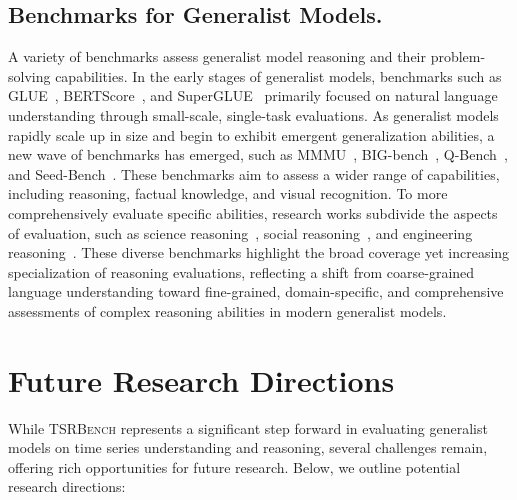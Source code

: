 \documentclass{article}
\theoremstyle{plain}
\theoremstyle{definition}
\theoremstyle{remark}
\theoremstyle{plain}
\begin{document}
\subsection{Benchmarks for Generalist Models.}
A variety of benchmarks assess generalist model reasoning and their problem-solving capabilities. In the early stages of generalist models, benchmarks such as GLUE~\citep{wang2018glue}, BERTScore~\citep{zhang2019bertscore}, and SuperGLUE~\citep{wang2019superglue} primarily focused on natural language understanding through small-scale, single-task evaluations. As generalist models rapidly scale up in size and begin to exhibit emergent generalization abilities, a new wave of benchmarks has emerged, such as MMMU~\citep{yue2024mmmu}, BIG-bench~\citep{srivastava2023beyond}, Q-Bench~\citep{wu2023q}, and Seed-Bench~\citep{li2023seed}. These benchmarks aim to assess a wider range of capabilities, including reasoning, factual knowledge, and visual recognition. To more comprehensively evaluate specific abilities, research works subdivide the aspects of evaluation, such as science reasoning~\citep{cobbe2021training, xu2025ugphysics, lu2023mathvista, zhang2024mathverse, zhong2025benchmarking}, social reasoning~\citep{guha2023legalbench, zhang2024cpsycoun, kim2023fantom}, and engineering reasoning~\citep{chen2021evaluating, jimenez2023swe, yu2018spider, guo2025toward, chen2025mvi, guo2025beyond}. These diverse benchmarks highlight the broad coverage yet increasing specialization of reasoning evaluations, reflecting a shift from coarse-grained language understanding toward fine-grained, domain-specific, and comprehensive assessments of complex reasoning abilities in modern generalist models.

\section{Future Research Directions}
While \textsc{TSRBench} represents a significant step forward in
evaluating generalist models on time series understanding
and reasoning, several challenges remain, offering rich
opportunities for future research. Below, we outline potential research directions:
\end{document}
